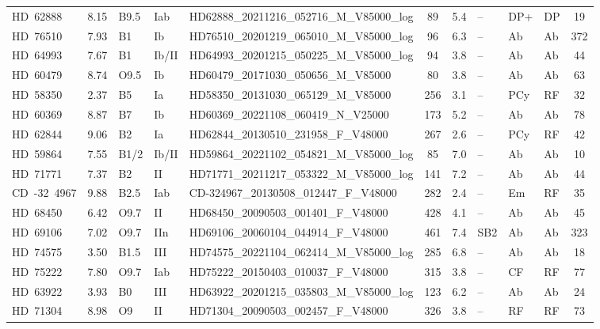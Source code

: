 {\begin{landscape}
\begin{longtable}{lclllcclllc}
\noalign{\smallskip}
HD~62888 & 8.15 & B9.5 & Iab & HD62888\_20211216\_052716\_M\_V85000\_log & 89 & 5.4 & -- & DP+ & DP & 19 \\
\noalign{\smallskip}
HD~76510 & 7.93 & B1 & Ib & HD76510\_20201219\_065010\_M\_V85000\_log & 96 & 6.3 & -- & Ab & Ab & 372 \\
\noalign{\smallskip}
HD~64993 & 7.67 & B1 & Ib/II & HD64993\_20201215\_050225\_M\_V85000\_log & 94 & 3.8 & -- & Ab & Ab & 44 \\
\noalign{\smallskip}
HD~60479 & 8.74 & O9.5 & Ib & HD60479\_20171030\_050656\_M\_V85000 & 80 & 3.8 & -- & Ab & Ab & 63 \\
\noalign{\smallskip}
HD~58350 & 2.37 & B5 & Ia & HD58350\_20131030\_065129\_M\_V85000 & 256 & 3.1 & -- & PCy & RF & 32 \\
\noalign{\smallskip}
HD~60369 & 8.87 & B7 & Ib & HD60369\_20221108\_060419\_N\_V25000 & 173 & 5.2 & -- & Ab & Ab & 78 \\
\noalign{\smallskip}
HD~62844 & 9.06 & B2 & Ia & HD62844\_20130510\_231958\_F\_V48000 & 267 & 2.6 & -- & PCy & RF & 42 \\
\noalign{\smallskip}
HD~59864 & 7.55 & B1/2 & Ib/II & HD59864\_20221102\_054821\_M\_V85000\_log & 85 & 7.0 & -- & Ab & Ab & 10 \\
\noalign{\smallskip}
HD~71771 & 7.37 & B2 & II & HD71771\_20211217\_053322\_M\_V85000\_log & 141 & 7.2 & -- & Ab & Ab & 44 \\
\noalign{\smallskip}
CD~-32~4967 & 9.88 & B2.5 & Iab & CD-324967\_20130508\_012447\_F\_V48000 & 282 & 2.4 & -- & Em & RF & 35 \\
\noalign{\smallskip}
HD~68450 & 6.42 & O9.7 & II & HD68450\_20090503\_001401\_F\_V48000 & 428 & 4.1 & -- & Ab & Ab & 45 \\
\noalign{\smallskip}
HD~69106 & 7.02 & O9.7 & IIn & HD69106\_20060104\_044914\_F\_V48000 & 461 & 7.4 & SB2 & Ab & Ab & 323 \\
\noalign{\smallskip}
HD~74575 & 3.50 & B1.5 & III & HD74575\_20221104\_062414\_M\_V85000\_log & 285 & 6.8 & -- & Ab & Ab & 18 \\
\noalign{\smallskip}
HD~75222 & 7.80 & O9.7 & Iab & HD75222\_20150403\_010037\_F\_V48000 & 315 & 3.8 & -- & CF & RF & 77 \\
\noalign{\smallskip}
HD~63922 & 3.93 & B0 & III & HD63922\_20201215\_035803\_M\_V85000\_log & 123 & 6.2 & -- & Ab & Ab & 24 \\
\noalign{\smallskip}
HD~71304 & 8.98 & O9 & II & HD71304\_20090503\_002457\_F\_V48000 & 326 & 3.8 & -- & RF & RF & 73 \\

\end{longtable}
\end{landscape}}
